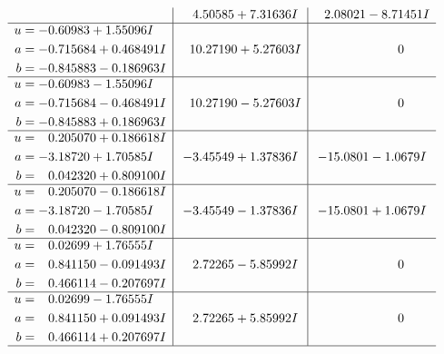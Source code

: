 \documentclass[1p]{elsarticle_modified}
\theoremstyle{definition}
\begin{document}
$$\begin{array}{c|c|c}
 & \phantom{-}4.50585 + 7.31636 I & \phantom{-}2.08021 - 8.71451 I \\ \hline\begin{aligned}
u &= -0.60983 + 1.55096 I \\
a &= -0.715684 + 0.468491 I \\
b &= -0.845883 - 0.186963 I\end{aligned}
 & \phantom{-}10.27190 + 5.27603 I & \phantom{-0.000000 } 0 \\ \hline\begin{aligned}
u &= -0.60983 - 1.55096 I \\
a &= -0.715684 - 0.468491 I \\
b &= -0.845883 + 0.186963 I\end{aligned}
 & \phantom{-}10.27190 - 5.27603 I & \phantom{-0.000000 } 0 \\ \hline\begin{aligned}
u &= \phantom{-}0.205070 + 0.186618 I \\
a &= -3.18720 + 1.70585 I \\
b &= \phantom{-}0.042320 + 0.809100 I\end{aligned}
 & -3.45549 + 1.37836 I & -15.0801 - 1.0679 I \\ \hline\begin{aligned}
u &= \phantom{-}0.205070 - 0.186618 I \\
a &= -3.18720 - 1.70585 I \\
b &= \phantom{-}0.042320 - 0.809100 I\end{aligned}
 & -3.45549 - 1.37836 I & -15.0801 + 1.0679 I \\ \hline\begin{aligned}
u &= \phantom{-}0.02699 + 1.76555 I \\
a &= \phantom{-}0.841150 - 0.091493 I \\
b &= \phantom{-}0.466114 - 0.207697 I\end{aligned}
 & \phantom{-}2.72265 - 5.85992 I & \phantom{-0.000000 } 0 \\ \hline\begin{aligned}
u &= \phantom{-}0.02699 - 1.76555 I \\
a &= \phantom{-}0.841150 + 0.091493 I \\
b &= \phantom{-}0.466114 + 0.207697 I\end{aligned}
 & \phantom{-}2.72265 + 5.85992 I & \phantom{-0.000000 } 0\\
 \hline 
 \end{array}$$\newpage$$\begin{array}{c|c|c}  

\end{array}$$
\end{document}
